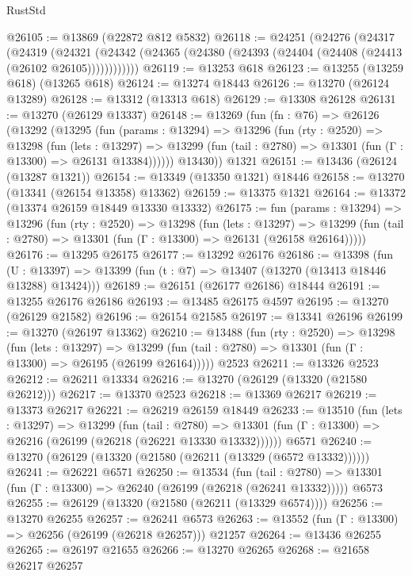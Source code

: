 \begin{lexlean}{RustStd}
\begin{coremodule}
@26105 := @13869 (@22872 @812 @5832)
@26118 := @24251
    (@24276
      (@24317
        (@24319
          (@24321 (@24342 (@24365 (@24380 (@24393 (@24404 (@24408 (@24413 (@26102 @26105))))))))))))
@26119 := @13253 @618
@26123 := @13255 (@13259 @618) (@13265 @618)
@26124 := @13274 @18443
@26126 := @13270 (@26124 @13289)
@26128 := @13312 (@13313 @618)
@26129 := @13308 @26128
@26131 := @13270 (@26129 @13337)
@26148 := @13269
    (fun (fn : @76) =>
    @26126
      (@13292
        (@13295
          (fun (params : @13294) =>
          @13296
            (fun (rty : @2520) =>
            @13298
              (fun (lets : @13297) =>
              @13299 (fun (tail : @2780) => @13301 (fun (Γ : @13300) => @26131 @13384))))))
        @13430))
    @1321
@26151 := @13436 (@26124 (@13287 @1321))
@26154 := @13349 (@13350 @1321) @18446
@26158 := @13270 (@13341 (@26154 @13358) @13362)
@26159 := @13375 @1321
@26164 := @13372 (@13374 @26159 @18449 @13330 @13332)
@26175 := fun (params : @13294) =>
  @13296
    (fun (rty : @2520) =>
    @13298
      (fun (lets : @13297) =>
      @13299 (fun (tail : @2780) => @13301 (fun (Γ : @13300) => @26131 (@26158 @26164)))))
@26176 := @13295 @26175
@26177 := @13292 @26176
@26186 := @13398
    (fun (U : @13397) => @13399 (fun (t : @7) => @13407 (@13270 (@13413 @18446 @13288) @13424)))
@26189 := @26151 (@26177 @26186) @18444
@26191 := @13255 @26176 @26186
@26193 := @13485 @26175 @4597
@26195 := @13270 (@26129 @21582)
@26196 := @26154 @21585
@26197 := @13341 @26196
@26199 := @13270 (@26197 @13362)
@26210 := @13488
    (fun (rty : @2520) =>
    @13298
      (fun (lets : @13297) =>
      @13299 (fun (tail : @2780) => @13301 (fun (Γ : @13300) => @26195 (@26199 @26164)))))
    @2523
@26211 := @13326 @2523
@26212 := @26211 @13334
@26216 := @13270 (@26129 (@13320 (@21580 @26212)))
@26217 := @13370 @2523
@26218 := @13369 @26217
@26219 := @13373 @26217
@26221 := @26219 @26159 @18449
@26233 := @13510
    (fun (lets : @13297) =>
    @13299
      (fun (tail : @2780) =>
      @13301 (fun (Γ : @13300) => @26216 (@26199 (@26218 (@26221 @13330 @13332))))))
    @6571
@26240 := @13270 (@26129 (@13320 (@21580 (@26211 (@13329 (@6572 @13332))))))
@26241 := @26221 @6571
@26250 := @13534
    (fun (tail : @2780) => @13301 (fun (Γ : @13300) => @26240 (@26199 (@26218 (@26241 @13332)))))
    @6573
@26255 := @26129 (@13320 (@21580 (@26211 (@13329 @6574))))
@26256 := @13270 @26255
@26257 := @26241 @6573
@26263 := @13552 (fun (Γ : @13300) => @26256 (@26199 (@26218 @26257))) @21257
@26264 := @13436 @26255
@26265 := @26197 @21655
@26266 := @13270 @26265
@26268 := @21658 @26217 @26257

\end{coremodule}
\end{lexlean}
